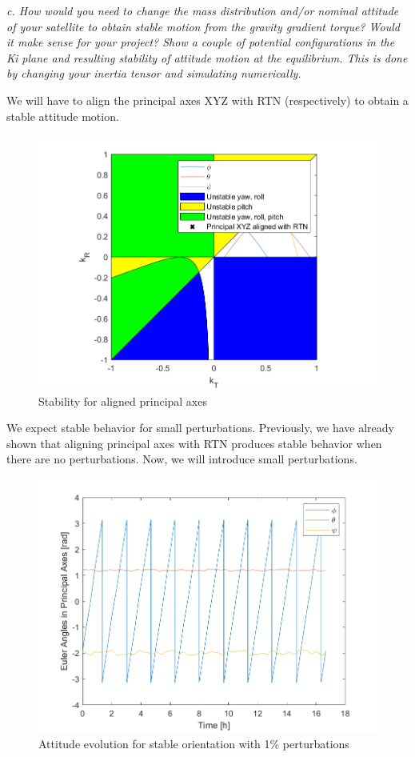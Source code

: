 \textit{c. How would you need to change the mass distribution and/or nominal attitude of your satellite to obtain stable motion from the gravity gradient torque? Would it make sense for your project? Show a couple of potential configurations in the Ki plane and resulting stability of attitude motion at the equilibrium. This is done by changing your inertia tensor and simulating numerically.}

We will have to align the principal axes XYZ with RTN (respectively) to obtain a stable attitude motion.

\begin{figure}[H]
\centering
\includegraphics[scale=0.8]{Images/ps5_problem1c.png}
\caption{Stability for aligned principal axes}
\label{fig:ps5_problem1c}
\end{figure}

We expect stable behavior for small perturbations. Previously, we have already shown that aligning principal axes with RTN produces stable behavior when there are no perturbations. Now, we will introduce small perturbations.

\begin{figure}[H]
\centering
\includegraphics[scale=0.6]{Images/ps5_problem1c_angle.png}
\caption{Attitude evolution for stable orientation with 1\% perturbations}
\label{fig:ps5_problem1c_angle}
\end{figure}

